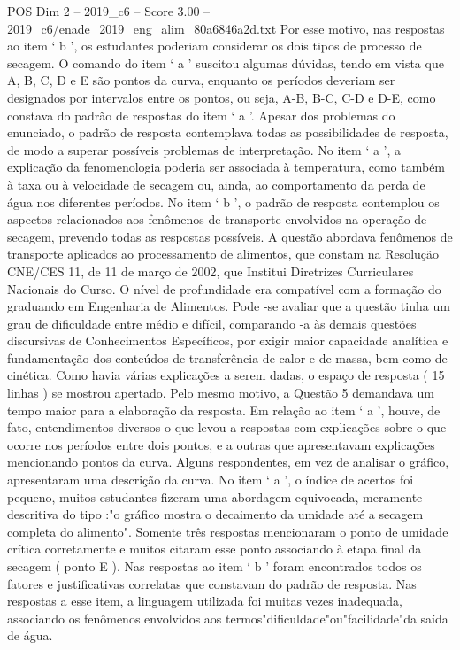 \begin{textsample}{POS Dim 2 – 2019\_c6 – Score 3.00 – 2019\_c6/enade\_2019\_eng\_alim\_80a6846a2d.txt}
Por esse motivo, nas respostas ao item ‘ b ’, os estudantes poderiam considerar os dois tipos de processo de secagem.
O comando do item ‘ a ’ suscitou algumas dúvidas, tendo em vista que A, B, C, D e E são pontos da curva, enquanto os períodos deveriam ser designados por intervalos entre os pontos, ou seja, A-B, B-C, C-D e D-E, como constava do padrão de respostas do item ‘ a ’.
Apesar dos problemas do enunciado, o padrão de resposta contemplava todas as possibilidades de resposta, de modo a superar possíveis problemas de interpretação.
No item ‘ a ’, a explicação da fenomenologia poderia ser associada à temperatura, como também à taxa ou à velocidade de secagem ou, ainda, ao comportamento da perda de água nos diferentes períodos.
No item ‘ b ’, o padrão de resposta contemplou os aspectos relacionados aos fenômenos de transporte envolvidos na operação de secagem, prevendo todas as respostas possíveis.
A questão abordava fenômenos de transporte aplicados ao processamento de alimentos, que constam na Resolução CNE/CES 11, de 11 de março de 2002, que Institui Diretrizes Curriculares Nacionais do Curso.
O nível de profundidade era compatível com a formação do graduando em Engenharia de Alimentos.
Pode -se avaliar que a questão tinha um grau de dificuldade entre médio e difícil, comparando -a às demais questões discursivas de Conhecimentos Específicos, por exigir maior capacidade analítica e fundamentação dos conteúdos de transferência de calor e de massa, bem como de cinética.
Como havia várias explicações a serem dadas, o espaço de resposta ( 15 linhas ) se mostrou apertado.
Pelo mesmo motivo, a Questão 5 demandava um tempo maior para a elaboração da resposta.
Em relação ao item ‘ a ’, houve, de fato, entendimentos diversos o que levou a respostas com explicações sobre o que ocorre nos períodos entre dois pontos, e a outras que apresentavam explicações mencionando pontos da curva.
Alguns respondentes, em vez de analisar o gráfico, apresentaram uma descrição da curva.
No item ‘ a ’, o índice de acertos foi pequeno, muitos estudantes fizeram uma abordagem equivocada, meramente descritiva do tipo :"o gráfico mostra o decaimento da umidade até a secagem completa do alimento".
Somente três respostas mencionaram o ponto de umidade crítica corretamente e muitos citaram esse ponto associando à etapa final da secagem ( ponto E ).
Nas respostas ao item ‘ b ’ foram encontrados todos os fatores e justificativas correlatas que constavam do padrão de resposta.
Nas respostas a esse item, a linguagem utilizada foi muitas vezes inadequada, associando os fenômenos envolvidos aos termos"dificuldade"ou"facilidade"da saída de água.

\end{textsample}
